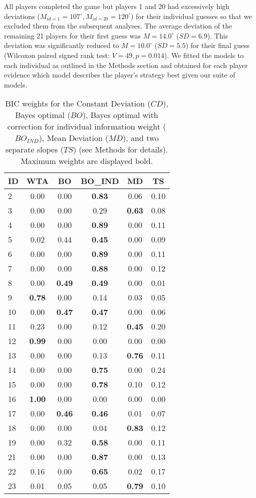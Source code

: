 \documentclass[jou]{apa}
\begin{document}
All players completed the game but players 1 and 20 had excessively high deviations ($M_{id=1}=107 ^\circ, M_{id=20}=120^\circ$) for their individual guesses so that we excluded them from the subsequent analyses. The average deviation of the remaining 21 players for their first guess was $M=14.0^\circ$ ($SD=6.9$). This deviation was significantly reduced to $M=10.0^\circ$ ($SD=5.5$) for their final guess (Wilcoxon paired signed rank test: $V=49, p=0.014$). 
We fitted the models to each individual as outlined in the Methods section and obtained for each player evidence which model describes the player's strategy best given our suite of models. 
\begin{table}[ht]
\begin{center}
\caption{BIC weights for the Constant Deviation ($CD$), Bayes optimal ($BO$), Bayes optimal with correction for individual information weight ($BO_{IND}$), Mean Deviation ($MD$), and two separate slopes ($TS$) (see Methods for details). Maximum weights are displayed bold. }
\begin{tabular}{lccccc}
  \hline
 ID& WTA & BO & BO\_IND & MD & TS \\ 
  \hline
2 & 0.00 & 0.00 &\textbf{ 0.83} & 0.06 & 0.10 \\ 
  3 & 0.00 & 0.00 & 0.29 & \textbf{ 0.63} & 0.08 \\ 
  4 & 0.00 & 0.00 & \textbf{ 0.89} & 0.00 & 0.11 \\ 
  5 & 0.02 & 0.44 & \textbf{ 0.45} & 0.00 & 0.09 \\ 
  6 & 0.00 & 0.00 & \textbf{ 0.89} & 0.00 & 0.11 \\ 
  7 & 0.00 & 0.00 & \textbf{ 0.88} & 0.00 & 0.12 \\ 
  8 & 0.00 & \textbf{ 0.49} & \textbf{ 0.49} & 0.00 & 0.01 \\ 
  9 & \textbf{ 0.78} & 0.00 & 0.14 & 0.03 & 0.05 \\ 
  10 & 0.00 & \textbf{ 0.47} & \textbf{ 0.47} & 0.00 & 0.06 \\ 
  11 & 0.23 & 0.00 & 0.12 & \textbf{ 0.45} & 0.20 \\ 
  12 & \textbf{ 0.99} & 0.00 & 0.00 & 0.00 & 0.00 \\ 
  13 & 0.00 & 0.00 & 0.13 & \textbf{ 0.76} & 0.11 \\ 
  14 & 0.00 & 0.00 & \textbf{ 0.75} & 0.00 & 0.24 \\ 
  15 & 0.00 & 0.00 & \textbf{ 0.78} & 0.10 & 0.12 \\ 
  16 & \textbf{1.00} & 0.00 & 0.00 & 0.00 & 0.00 \\ 
  17 & 0.00 & \textbf{ 0.46} & \textbf{ 0.46} & 0.01 & 0.07 \\ 
  18 & 0.00 & 0.00 & 0.04 & \textbf{ 0.83} & 0.12 \\ 
  19 & 0.00 & 0.32 & \textbf{ 0.58} & 0.00 & 0.11 \\ 
  21 & 0.00 & 0.00 & \textbf{ 0.87} & 0.00 & 0.13 \\ 
  22 & 0.16 & 0.00 & \textbf{ 0.65} & 0.02 & 0.17 \\ 
  23 & 0.01 & 0.05 & 0.05 & \textbf{ 0.79} & 0.10 \\
   \hline
\end{tabular}
\end{center}
\end{table}
\end{document}
